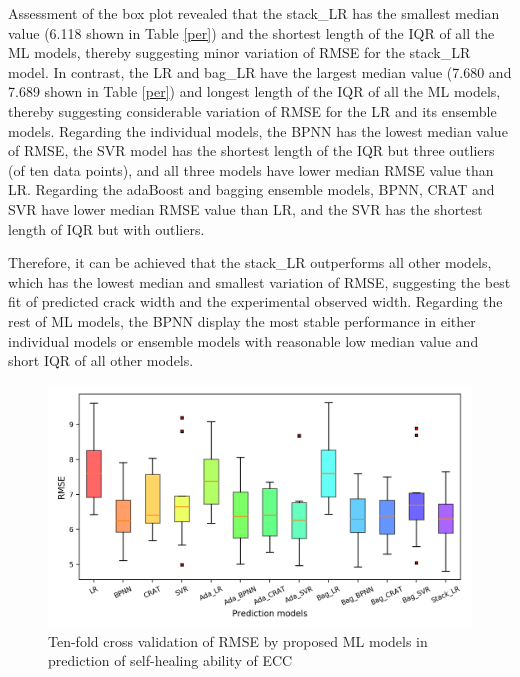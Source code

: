 \documentclass[11pt]{article}
\begin{document}
	
	Assessment of the box plot revealed that the stack\_LR has the smallest median value (6.118 shown in Table \ref{per}) and the shortest length of the IQR of all the ML models, thereby suggesting minor variation of RMSE for the stack\_LR model. In contrast, the LR and bag\_LR have the largest median value (7.680 and 7.689 shown in Table \ref{per}) and longest length of the IQR of all the ML models, thereby suggesting considerable variation of RMSE for the LR and its ensemble models. Regarding the individual models, the BPNN has the lowest median value of RMSE, the SVR model has the shortest length of the IQR but three outliers (of ten data points), and all three models have lower median RMSE value than LR. Regarding the adaBoost and bagging ensemble models, BPNN, CRAT and SVR have lower median RMSE value than LR, and the SVR has the shortest length of IQR but with outliers. 
	
	Therefore, it can be achieved that the stack\_LR outperforms all other models, which has the lowest median and smallest variation of RMSE, suggesting the best fit of predicted crack width and the experimental observed width. Regarding the rest of ML models, the BPNN display the most stable performance in either individual models or ensemble models with reasonable low median value and short IQR of all other models. 
	
	
	\begin{figure}[!h]
		\centering
		\includegraphics[width=\textwidth]{boxRMSE.png}
		\caption{Ten-fold cross validation of RMSE by proposed ML models in prediction of self-healing ability of ECC}
		\label{bar}
	\end{figure}
	
\end{document}

